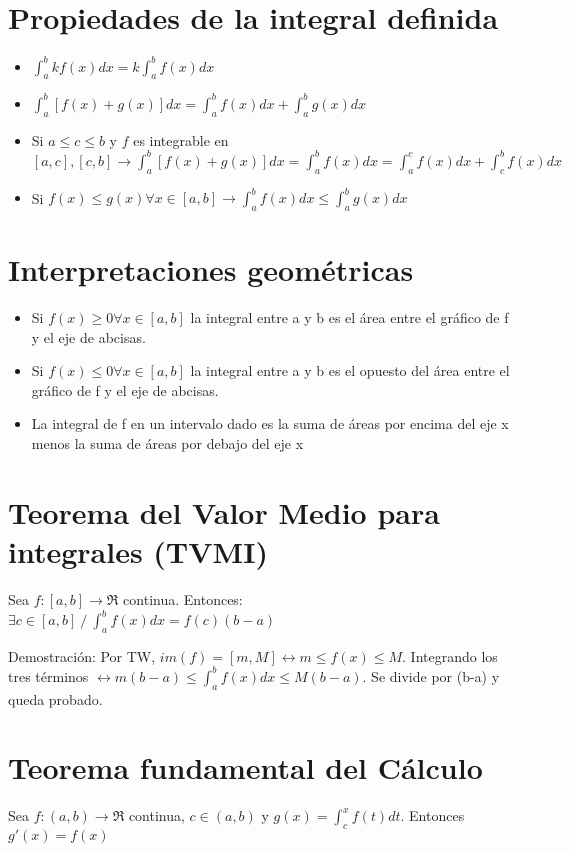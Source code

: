 \documentclass{report}
\begin{document}
	\section{Propiedades de la integral definida}
		\begin{itemize}
			\item $\int_{a}^{b}kf(x)dx = k \int_{a}^{b}f(x)dx$
			\item $\int_{a}^{b}[f(x)+g(x)]dx=\int_{a}^{b}f(x)dx+\int_{a}^{b}g(x)dx$
			\item Si $a\leq c \leq b$ y $f$ es integrable en $[a,c],[c,b] \rightarrow \int_{a}^{b}[f(x)+g(x)]dx=\int_{a}^{b}f(x)dx=\int_{a}^{c}f(x)dx+\int_{c}^{b}f(x)dx$
			\item Si $f(x) \leq g(x) \forall x \in [a,b] \rightarrow \int_{a}^{b}f(x)dx \leq \int_{a}^{b}g(x)dx$
		\end{itemize}


	\section{Interpretaciones geométricas}
		\begin{itemize}
			\item Si $f(x)\geq 0 \forall x \in [a,b]$ la integral entre a y b es el área entre el gráfico de f y el eje de abcisas.
			\item Si $f(x)\leq 0 \forall x \in [a,b]$ la integral entre a y b es el opuesto del área entre el gráfico de f y el eje de abcisas.
			\item La integral de f en un intervalo dado es la suma de áreas por encima del eje x menos la suma de áreas por debajo del eje x
		\end{itemize}
	
	
	\section{Teorema del Valor Medio para integrales (TVMI)}
		Sea $f:[a,b]\to \Re$ continua.
		Entonces: $\exists c \in [a,b] \ / \ \int_{a}^{b}f(x)dx=f(c)(b-a)$
		
		Demostración: Por TW, $im(f)=[m,M]\leftrightarrow m\leq f(x) \leq M.$ Integrando los tres términos $\leftrightarrow m(b-a) \leq \int_{a}^{b}f(x)dx \leq M(b-a)$. Se divide por (b-a) y queda probado.
		
	\section{Teorema fundamental del Cálculo}
		Sea $f:(a,b) \to \Re$ continua, $c \in (a,b)$ y $g(x)=\int_{c}^{x}f(t)dt$.
		Entonces $g'(x)=f(x)$
		
\end{document}
